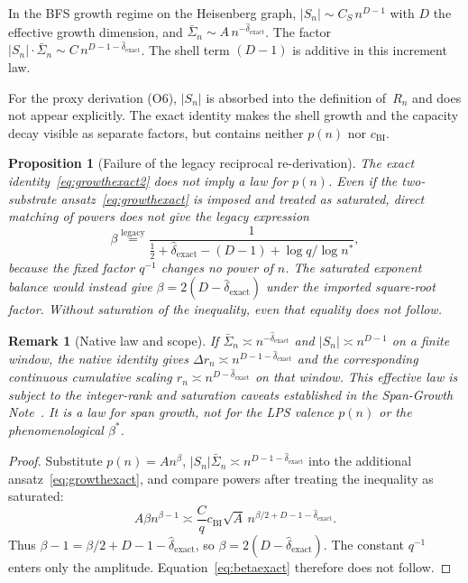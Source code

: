 \documentclass[11pt,a4paper]{article}
\newtheorem{proposition}[theorem]{Proposition}
\newtheorem{remark}[theorem]{Remark}
\newcommand{\Rn}{R_n}
\newcommand{\Sn}{\bar{\Sigma}_n}
\newcommand{\dexact}{\hat{\delta}_{\mathrm{exact}}}
\newcommand{\bstar}{\beta^{*}}
\begin{document}
In the BFS growth regime on the Heisenberg graph,
$|S_n| \sim C_S \, n^{D-1}$ with $D$ the effective growth dimension,
and $\Sn \sim A \, n^{-\dexact}$.
The factor $|S_n| \cdot \Sn \sim C \, n^{D - 1 - \dexact}$.
The shell term $(D-1)$ is additive in this increment law.

For the proxy derivation (O6), $|S_n|$ is absorbed into the
definition of~$\Rn$ and does not appear explicitly.
The exact identity makes the shell growth and the capacity decay visible as separate factors,
but contains neither $p(n)$ nor $c_{\mathrm{BI}}$.

\begin{proposition}[Failure of the legacy reciprocal re-derivation]
\label{hyp:growthexact}
The exact identity~\eqref{eq:growthexact2} does not imply a law for $p(n)$.
Even if the two-substrate ansatz~\eqref{eq:growthexact} is imposed and treated as saturated,
direct matching of powers does not give the legacy expression
\begin{equation}
\label{eq:betaexact}
\beta \stackrel{\mathrm{legacy}}{=}
\frac{1}{\tfrac{1}{2} + \dexact - (D - 1)
+ \log q / \log n^{*}},
\end{equation}
because the fixed factor $q^{-1}$ changes no power of $n$.
The saturated exponent balance would instead give
$\beta=2(D-\dexact)$ under the imported square-root factor.
Without saturation of the inequality, even that equality does not follow.
\end{proposition}

\begin{remark}[Native law and scope]
\label{rem:status}
If $\Sn\asymp n^{-\dexact}$ and $|S_n|\asymp n^{D-1}$ on a finite window, the native identity
gives $\Delta r_n\asymp n^{D-1-\dexact}$ and the corresponding continuous cumulative scaling
$r_n\asymp n^{D-\dexact}$ on that window.
This effective law is subject to the integer-rank and saturation caveats established in the
Span-Growth Note~\cite{Beau2026sgn}.
It is a law for span growth, not for the LPS valence $p(n)$ or the phenomenological $\bstar$.
\end{remark}

\begin{proof}
Substitute $p(n)=A n^\beta$, $|S_n|\Sn\asymp n^{D-1-\dexact}$ into the additional
ansatz~\eqref{eq:growthexact}, and compare powers after treating the inequality as saturated:
\[
A \beta n^{\beta - 1}
\asymp \frac{C}{q}c_{\mathrm{BI}}\sqrt{A}\,
n^{\beta/2+D-1-\dexact}.
\]
Thus $\beta-1=\beta/2+D-1-\dexact$, so $\beta=2(D-\dexact)$.
The constant $q^{-1}$ enters only the amplitude.
Equation~\eqref{eq:betaexact} therefore does not follow.
\end{proof}
\end{document}
